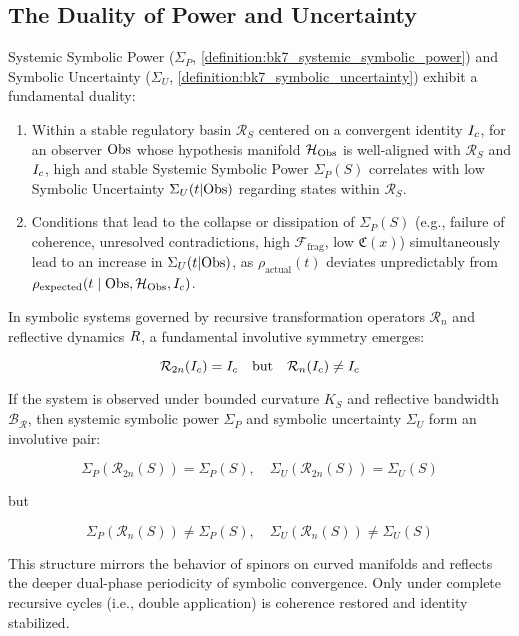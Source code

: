 \subsection{The Duality of Power and Uncertainty}
\label{subsec:bk7_duality_power_uncertainty}

\begin{proposition}
\label{proposition:bk7_power_uncertainty_duality}
Systemic Symbolic Power (\(\Sigma_P\), \ref{definition:bk7_systemic_symbolic_power}) and Symbolic Uncertainty (\(\Sigma_U\), \ref{definition:bk7_symbolic_uncertainty}) exhibit a fundamental duality:
\begin{enumerate}
    \item Within a stable regulatory basin \(\mathcal{R}_S\) centered on a convergent identity \(I_c\), for an observer \(\mathrm{Obs}\) whose hypothesis manifold \(\mathcal{H}_{\mathrm{Obs}}\) is well-aligned with \(\mathcal{R}_S\) and \(I_c\), high and stable Systemic Symbolic Power \(\Sigma_P(S)\) correlates with low Symbolic Uncertainty \(\Sigma_U(t|\mathrm{Obs})\) regarding states within \(\mathcal{R}_S\).
    \item Conditions that lead to the collapse or dissipation of \(\Sigma_P(S)\) (e.g., failure of coherence, unresolved contradictions, high \(\mathcal{F}_{\text{frag}}\), low \(\mathfrak{C}(x)\)) simultaneously lead to an increase in \(\Sigma_U(t|\mathrm{Obs})\), as \(\rho_{\text{actual}}(t)\) deviates unpredictably from \(\rho_{\text{expected}}(t \mid \mathrm{Obs}, \mathcal{H}_{\mathrm{Obs}}, I_c)\).
\end{enumerate}
\end{proposition}
\begin{lemma}
\label{lemma:bk7_involutive_dual_symmetry}
In symbolic systems governed by recursive transformation operators \(\mathcal{R}_n\) and reflective dynamics \(R\), a fundamental involutive symmetry emerges:

\[
\mathcal{R}_{2n}(I_c) = I_c \quad \text{but} \quad \mathcal{R}_n(I_c) \neq I_c
\]

If the system is observed under bounded curvature \(K_S\) and reflective bandwidth \(\mathcal{B_R}\), then systemic symbolic power \(\Sigma_P\) and symbolic uncertainty \(\Sigma_U\) form an involutive pair:

\[
\Sigma_P(\mathcal{R}_{2n}(S)) = \Sigma_P(S), \quad \Sigma_U(\mathcal{R}_{2n}(S)) = \Sigma_U(S)
\]

but

\[
\Sigma_P(\mathcal{R}_{n}(S)) \ne \Sigma_P(S), \quad \Sigma_U(\mathcal{R}_{n}(S)) \ne \Sigma_U(S)
\]

This structure mirrors the behavior of spinors on curved manifolds and reflects the deeper dual-phase periodicity of symbolic convergence. Only under complete recursive cycles (i.e., double application) is coherence restored and identity stabilized.

\end{lemma}
